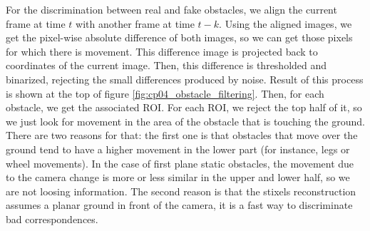 For the discrimination between real and fake obstacles, we align the current frame at time $t$ with another frame at time $t - k$. Using the aligned images, we get the pixel-wise absolute difference of both images, so we can get those pixels for which there is movement. This difference image is projected back to coordinates of the current image. Then, this difference is thresholded and binarized, rejecting the small differences produced by noise. Result of this process is shown at the top of figure \ref{fig:cp04_obstacle_filtering}. Then, for each obstacle, we get the associated \ac{ROI}. For each \ac{ROI}, we reject the top half of it, so we just look for movement in the area of the obstacle that is touching the ground. There are two reasons for that: the first one is that obstacles that move over the ground tend to have a higher movement in the lower part (for instance, legs or wheel movements). In the case of first plane static obstacles, the movement due to the camera change is more or less similar in the upper and lower half, so we are not loosing information. The second reason is that the stixels reconstruction assumes a planar ground in front of the camera, it is a fast way to discriminate bad correspondences.

